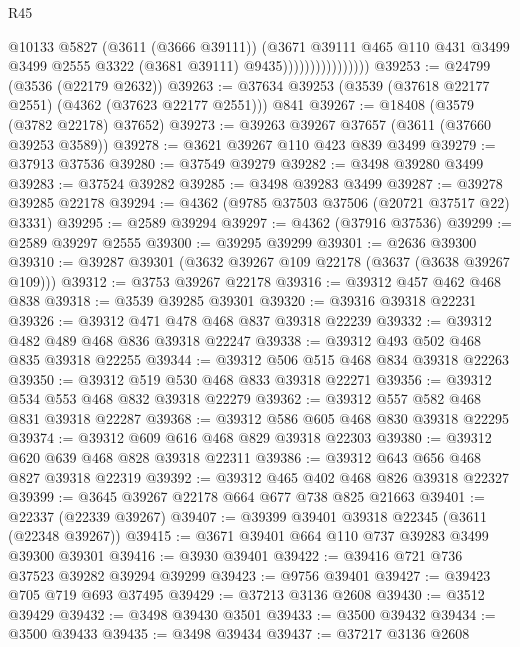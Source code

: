 \begin{lexlean}{R45}
\begin{coremodule}
                                  @10133
                                  @5827
                                  (@3611 (@3666 @39111))
                                  (@3671
                                    @39111
                                    @465
                                    @110
                                    @431
                                    @3499
                                    @3499
                                    @2555
                                    @3322
                                    (@3681 @39111)
                                    @9435))))))))))))))))
@39253 := @24799 (@3536 (@22179 @2632))
@39263 := @37634 @39253 (@3539 (@37618 @22177 @2551) (@4362 (@37623 @22177 @2551))) @841
@39267 := @18408 (@3579 (@3782 @22178) @37652)
@39273 := @39263 @39267 @37657 (@3611 (@37660 @39253 @3589))
@39278 := @3621 @39267 @110 @423 @839 @3499
@39279 := @37913 @37536
@39280 := @37549 @39279
@39282 := @3498 @39280 @3499
@39283 := @37524 @39282
@39285 := @3498 @39283 @3499
@39287 := @39278 @39285 @22178
@39294 := @4362 (@9785 @37503 @37506 (@20721 @37517 @22) @3331)
@39295 := @2589 @39294
@39297 := @4362 (@37916 @37536)
@39299 := @2589 @39297 @2555
@39300 := @39295 @39299
@39301 := @2636 @39300
@39310 := @39287 @39301 (@3632 @39267 @109 @22178 (@3637 (@3638 @39267 @109)))
@39312 := @3753 @39267 @22178
@39316 := @39312 @457 @462 @468 @838
@39318 := @3539 @39285 @39301
@39320 := @39316 @39318 @22231
@39326 := @39312 @471 @478 @468 @837 @39318 @22239
@39332 := @39312 @482 @489 @468 @836 @39318 @22247
@39338 := @39312 @493 @502 @468 @835 @39318 @22255
@39344 := @39312 @506 @515 @468 @834 @39318 @22263
@39350 := @39312 @519 @530 @468 @833 @39318 @22271
@39356 := @39312 @534 @553 @468 @832 @39318 @22279
@39362 := @39312 @557 @582 @468 @831 @39318 @22287
@39368 := @39312 @586 @605 @468 @830 @39318 @22295
@39374 := @39312 @609 @616 @468 @829 @39318 @22303
@39380 := @39312 @620 @639 @468 @828 @39318 @22311
@39386 := @39312 @643 @656 @468 @827 @39318 @22319
@39392 := @39312 @465 @402 @468 @826 @39318 @22327
@39399 := @3645 @39267 @22178 @664 @677 @738 @825 @21663
@39401 := @22337 (@22339 @39267)
@39407 := @39399 @39401 @39318 @22345 (@3611 (@22348 @39267))
@39415 := @3671 @39401 @664 @110 @737 @39283 @3499 @39300 @39301
@39416 := @3930 @39401
@39422 := @39416 @721 @736 @37523 @39282 @39294 @39299
@39423 := @9756 @39401
@39427 := @39423 @705 @719 @693 @37495
@39429 := @37213 @3136 @2608
@39430 := @3512 @39429
@39432 := @3498 @39430 @3501
@39433 := @3500 @39432
@39434 := @3500 @39433
@39435 := @3498 @39434
@39437 := @37217 @3136 @2608

\end{coremodule}
\end{lexlean}
